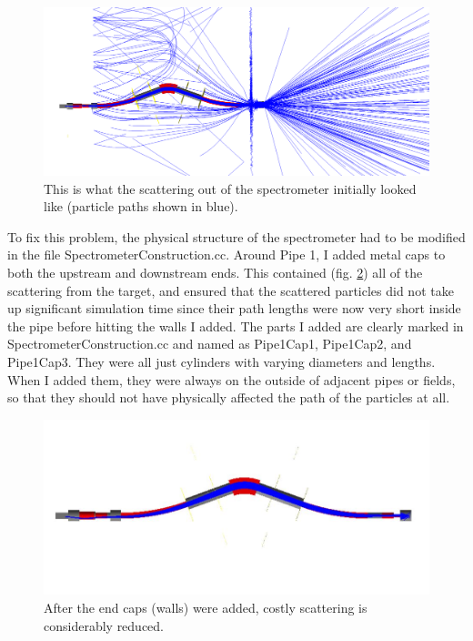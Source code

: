 \documentclass{article}
\begin{document}
\begin{figure}[h!]
\centering
\includegraphics[scale=0.2]{lol.png} 
\caption{This is what the scattering out of the spectrometer initially looked like (particle paths shown in blue).}
\label{scattering}
\end{figure}
 
To fix this problem, the physical structure of the spectrometer had to be modified in the file SpectrometerConstruction.cc. Around Pipe 1, I added metal caps to both the upstream and downstream ends. This contained (fig. \ref{noscattering}) all of the scattering from the target, and ensured that the scattered particles did not take up significant simulation time since their path lengths were now very short inside the pipe before hitting the walls I added. The parts I added are clearly marked in SpectrometerConstruction.cc and named as Pipe1Cap1, Pipe1Cap2, and Pipe1Cap3. They were all just cylinders with varying diameters and lengths. When I added them, they were always on the outside of adjacent pipes or fields, so that they should not have physically affected the path of the particles at all.   

\begin{figure}[h!]
\centering
\includegraphics[scale=0.7]{Capture.JPG} 
\caption{After the end caps (walls) were added, costly scattering is considerably reduced.}
\label{noscattering}
\end{figure}
\end{document}
